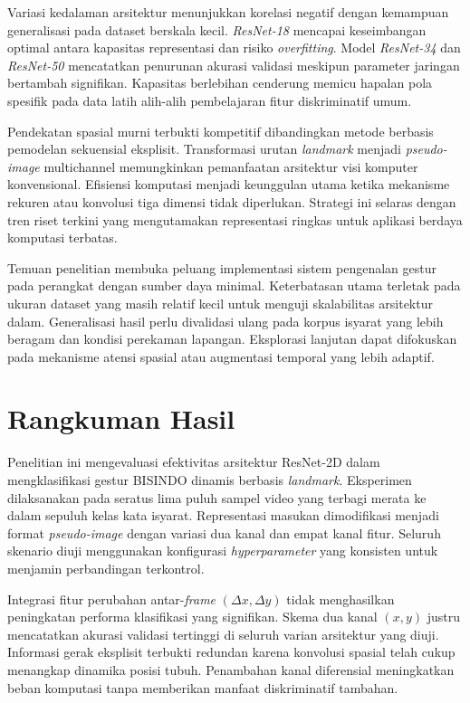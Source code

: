 Variasi kedalaman arsitektur menunjukkan korelasi negatif dengan kemampuan generalisasi pada dataset berskala kecil.
\textit{ResNet-18} mencapai keseimbangan optimal antara kapasitas representasi dan risiko \textit{overfitting}.
Model \textit{ResNet-34} dan \textit{ResNet-50} mencatatkan penurunan akurasi validasi meskipun parameter jaringan bertambah signifikan.
Kapasitas berlebihan cenderung memicu hapalan pola spesifik pada data latih alih-alih pembelajaran fitur diskriminatif umum.

Pendekatan spasial murni terbukti kompetitif dibandingkan metode berbasis pemodelan sekuensial eksplisit.
Transformasi urutan \textit{landmark} menjadi \textit{pseudo-image} multichannel memungkinkan pemanfaatan arsitektur visi komputer konvensional.
Efisiensi komputasi menjadi keunggulan utama ketika mekanisme rekuren atau konvolusi tiga dimensi tidak diperlukan.
Strategi ini selaras dengan tren riset terkini yang mengutamakan representasi ringkas untuk aplikasi berdaya komputasi terbatas.

Temuan penelitian membuka peluang implementasi sistem pengenalan gestur pada perangkat dengan sumber daya minimal.
Keterbatasan utama terletak pada ukuran dataset yang masih relatif kecil untuk menguji skalabilitas arsitektur dalam.
Generalisasi hasil perlu divalidasi ulang pada korpus isyarat yang lebih beragam dan kondisi perekaman lapangan.
Eksplorasi lanjutan dapat difokuskan pada mekanisme atensi spasial atau augmentasi temporal yang lebih adaptif.

\section{Rangkuman Hasil}
\label{sec:rangkuman-hasil}
Penelitian ini mengevaluasi efektivitas arsitektur ResNet-2D dalam mengklasifikasi gestur BISINDO dinamis berbasis \textit{landmark}.
Eksperimen dilaksanakan pada seratus lima puluh sampel video yang terbagi merata ke dalam sepuluh kelas kata isyarat.
Representasi masukan dimodifikasi menjadi format \textit{pseudo-image} dengan variasi dua kanal dan empat kanal fitur.
Seluruh skenario diuji menggunakan konfigurasi \textit{hyperparameter} yang konsisten untuk menjamin perbandingan terkontrol.

Integrasi fitur perubahan antar-\textit{frame} $(\Delta x, \Delta y)$ tidak menghasilkan peningkatan performa klasifikasi yang signifikan.
Skema dua kanal $(x, y)$ justru mencatatkan akurasi validasi tertinggi di seluruh varian arsitektur yang diuji.
Informasi gerak eksplisit terbukti redundan karena konvolusi spasial telah cukup menangkap dinamika posisi tubuh.
Penambahan kanal diferensial meningkatkan beban komputasi tanpa memberikan manfaat diskriminatif tambahan.

